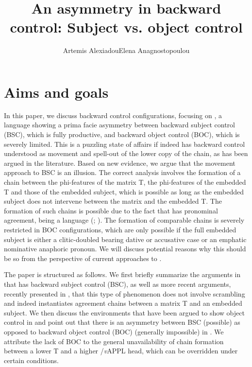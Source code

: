 \documentclass[output=paper]{langsci/langscibook}
\author{Artemis Alexiadou\affiliation{Humboldt-Universität zu Berlin\\Leibniz-Zentrum Allgemeine Sprachwissenschaft, Berlin}\lastand Elena Anagnostopoulou\affiliation{University of Crete}}
\title{An asymmetry in backward control: Subject vs. object control}
\begin{document}
\citereset

 

\section{Aims and goals}

In this paper, we discuss backward control configurations, focusing on , a language showing a prima facie asymmetry between backward subject control (BSC), which is fully productive, and backward object control (BOC), which is severely limited. This is a puzzling state of affairs if  indeed has backward control understood as movement and spell-out of the lower copy of the chain, as has been argued in the literature. Based on new evidence, we argue that the movement approach to  BSC is an illusion. The correct analysis involves the formation of a chain between the phi-features of the matrix T, the phi-features of the embedded T and those of the embedded subject, which is possible as long as the embedded subject does not intervene between the matrix and the embedded T. The formation of such chains is possible due to the fact that  has pronominal agreement, being a  language (\citealt{Alexiadou1998}; \citealt{Barbosa2009}). The formation of comparable chains is severely restricted in BOC configurations, which are only possible if the full embedded subject is either a clitic-doubled  bearing dative or accusative case or an emphatic nominative anaphoric pronoun. We will discuss potential reasons why this should be so from the perspective of current approaches to .

The paper is structured as follows. We first briefly summarize the arguments in \citet{Alexiadou2010} that  has backward subject control (BSC), as well as more recent arguments, recently presented in \citet{Tsakali2017}, that this type of phenomenon does not involve scrambling and indeed instantiates agreement chains between a matrix T and an embedded subject. We then discuss the environments that have been argued to show object control in  and point out that there is an asymmetry between BSC (possible) as opposed to backward object control (BOC) (generally impossible) in . We attribute the lack of BOC to the general unavailability of chain formation between a lower T and a higher \slash \textit{v}APPL head, which can be overridden under certain conditions.
\end{document}
